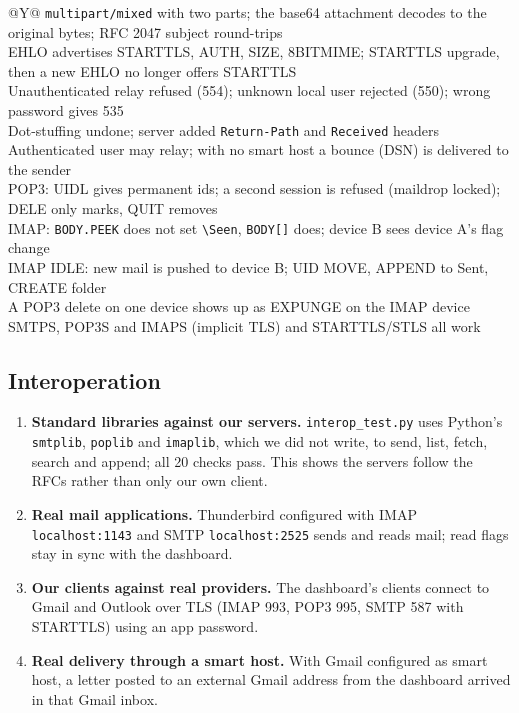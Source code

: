 \documentclass[11pt,a4paper]{article}
\begin{document}
\begin{table}[H]
\centering
\caption{Selected verification checks (all passed)}
\small
\begin{tabularx}{\textwidth}{@{}Y@{}}
\toprule
\texttt{multipart/mixed} with two parts; the base64 attachment decodes to the original bytes; RFC 2047 subject round-trips \\
EHLO advertises STARTTLS, AUTH, SIZE, 8BITMIME; STARTTLS upgrade, then a new EHLO no longer offers STARTTLS \\
Unauthenticated relay refused (554); unknown local user rejected (550); wrong password gives 535 \\
Dot-stuffing undone; server added \texttt{Return-Path} and \texttt{Received} headers \\
Authenticated user may relay; with no smart host a bounce (DSN) is delivered to the sender \\
POP3: UIDL gives permanent ids; a second session is refused (maildrop locked); DELE only marks, QUIT removes \\
IMAP: \texttt{BODY.PEEK} does not set \texttt{\textbackslash Seen}, \texttt{BODY[]} does; device B sees device A's flag change \\
IMAP IDLE: new mail is pushed to device B; UID MOVE, APPEND to Sent, CREATE folder \\
A POP3 delete on one device shows up as EXPUNGE on the IMAP device \\
SMTPS, POP3S and IMAPS (implicit TLS) and STARTTLS/STLS all work \\ \bottomrule
\end{tabularx}
\end{table}

\subsection{Interoperation}
\begin{enumerate}[leftmargin=2em]
    \item \textbf{Standard libraries against our servers.} \texttt{interop\_test.py} uses Python's \texttt{smtplib}, \texttt{poplib} and \texttt{imaplib}, which we did not write, to send, list, fetch, search and append; all 20 checks pass. This shows the servers follow the RFCs rather than only our own client.
    \item \textbf{Real mail applications.} Thunderbird configured with IMAP \texttt{localhost:1143} and SMTP \texttt{localhost:2525} sends and reads mail; read flags stay in sync with the dashboard.
    \item \textbf{Our clients against real providers.} The dashboard's clients connect to Gmail and Outlook over TLS (IMAP 993, POP3 995, SMTP 587 with STARTTLS) using an app password.
    \item \textbf{Real delivery through a smart host.} With Gmail configured as smart host, a letter posted to an external Gmail address from the dashboard arrived in that Gmail inbox.
\end{enumerate}
\end{document}
